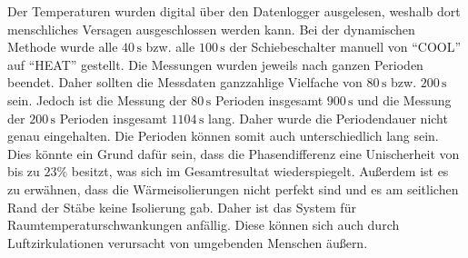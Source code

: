 Der Temperaturen wurden digital über den Datenlogger ausgelesen, weshalb dort menschliches Versagen ausgeschlossen werden kann.
Bei der dynamischen Methode wurde alle $40\,\unit{\second}$ bzw. alle $100\,\unit{\second}$ der Schiebeschalter manuell
von \enquote{COOL} auf \enquote{HEAT} gestellt. Die Messungen wurden jeweils nach ganzen Perioden beendet. Daher sollten die 
Messdaten ganzzahlige Vielfache von $80\,\unit{\second}$ bzw. $200\,\unit{\second}$ sein. Jedoch ist die Messung der 
$80\,\unit{\second}$ Perioden insgesamt $900\,\unit{\second}$ und die Messung der $200\,\unit{\second}$ Perioden insgesamt 
$1104\,\unit{\second}$ lang.
Daher wurde die Periodendauer nicht genau eingehalten. Die Perioden können somit auch unterschiedlich lang sein.
Dies könnte ein Grund dafür sein, dass die Phasendifferenz eine Unischerheit von bis zu $23{\%}$ besitzt, was sich im Gesamtresultat wiederspiegelt.
Außerdem ist es zu erwähnen, dass die Wärmeisolierungen nicht perfekt sind und es am seitlichen Rand der Stäbe keine
Isolierung gab. Daher ist das System für Raumtemperaturschwankungen anfällig. Diese können sich auch durch Luftzirkulationen 
verursacht von umgebenden Menschen äußern.



%
